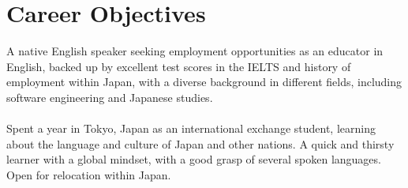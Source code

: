 \section*{Career Objectives}

A native English speaker seeking employment opportunities as an educator in English, backed up by excellent test scores in the IELTS and history of employment within Japan, with a diverse background in different fields, including software engineering and Japanese studies.  
\\
\\
Spent a year in Tokyo, Japan as an international exchange student, learning about the language and culture of Japan and other nations. A quick and thirsty learner with a global mindset, with a good grasp of several spoken languages. Open for relocation within Japan.

